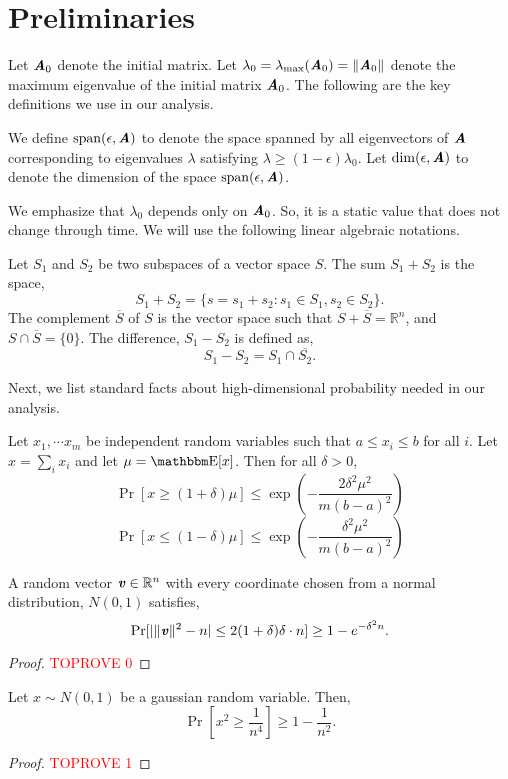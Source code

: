 
\section{Preliminaries}
\label{sec:prelims}
Let $\AA_0$ denote the initial matrix. Let $\lambda_0 = \lambda_{\max}(\AA_{0}) = \|\AA_{0}\|$ denote the maximum eigenvalue of the initial matrix $\AA_0$.
The following are the key definitions we use in our analysis.

\begin{definition} We define $\Span(\epsilon,\AA)$ to denote the space spanned by all eigenvectors of $\AA$ corresponding to eigenvalues $\lambda$ satisfying $\lambda \geq (1-\epsilon)\lambda_0$. Let $\dim{\epsilon,\AA}$ to denote the dimension of the space $\Span(\epsilon,\AA)$.
\end{definition}

We emphasize that $\lambda_0$ depends only on $\AA_0$. So, it is a static value that does not change through time. 
We will use the following linear algebraic notations.

\begin{definition}\label{def:subspace}Let $S_1$ and $S_2$ be two subspaces of a vector space $S$. The sum $S_1+S_2$ is the space,
\[
S_1+S_2 = \{s=s_1+s_2: s_1\in S_1, s_2 \in S_2\}.
\]
The complement $\overline{S}$ of $S$ is the vector space such that $S+\overline{S} = \mathbb{R}^n$, and $S\cap \overline{S} = \{0\}$. The difference, $S_1-S_2$ is defined as,
\[
S_1-S_2 = S_1\cap \overline{S_2}.
\]
\end{definition}

Next, we list standard facts about high-dimensional probability needed in our analysis.

\begin{lemma}\label{lem:Bernstein} Let $x_1,\cdots x_m$ be independent random variables such that $a\leq x_i\leq b$ for all $i$. Let $x = \sum_i x_i$ and let $\mu = \av[x]$. Then for all $\delta>0$,
\[
\Pr[x\geq(1+ \delta) \mu] \leq \exp \left(- \frac{2\delta^2\mu^2 }{m(b-a)^2} \right)
\]
\[
\Pr[x \leq (1-\delta) \mu] \leq \exp \left(- \frac{\delta^2\mu^2 }{m(b-a)^2} \right)
\]
\end{lemma}

\begin{lemma}\label{lem:NormG}
A random vector $\vv \in \mathbb{R}^n$ with every coordinate chosen from a normal distribution, $N(0,1)$ satisfies,
\[
\Pr[|\|\vv\|^2- n| \leq 2(1+\delta)\delta\cdot n ] \geq 1- e^{-\delta^2  n}.
\]
\end{lemma}
\begin{proof}\textcolor{red}{TOPROVE 0}\end{proof}

\begin{lemma}\label{lem:chi}
Let $x\sim N(0,1)$ be a gaussian random variable. Then,
\[
\Pr\left[x^2\geq \frac{1}{n^4}\right] \geq 1- \frac{1}{n^{2}}.
\]
\end{lemma}
\begin{proof}\textcolor{red}{TOPROVE 1}\end{proof}


